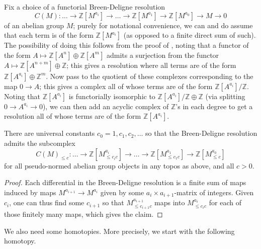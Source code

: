 Fix a choice of a functorial Breen-Deligne resolution
\[
C(M):\ldots \to \mathbb Z[M^{a_i}]\to\ldots\to\mathbb
Z[M^{a_1}]\to\mathbb Z[M^{a_0}]\to M\to 0
\]
of an abelian group $M$; purely for notational convenience, we can and do assume that each term is of the form $\mathbb Z[M^{a_i}]$ (as opposed to a finite direct sum of such). The possibility of doing this follows from the proof of \cite[Theorem 4.10]{Condensed}, noting that a functor of the form $A\mapsto \mathbb Z[A^n]\oplus \mathbb Z[A^m]$ admits a surjection from the functor $A\mapsto \mathbb Z[A^{n+m}]\oplus \mathbb Z$; this gives a resolution where all terms are of the form $\mathbb Z[A^{a_i}]\oplus \mathbb Z^m$. Now pass to the quotient of these complexes corresponding to the map $0\to A$; this gives a complex all of whose terms are of the form $\mathbb Z[A^{a_i}]/\mathbb Z$. Noting that $\mathbb Z[A^{a_i}]$ is functorially isomorphic to $\mathbb Z[A^{a_i}]/\mathbb Z\oplus \mathbb Z$ (via splitting $0\to A^{a_i}\to 0$), we can then add an acyclic complex of $\mathbb Z$'s in each degree to get a resolution all of whose terms are of the form $\mathbb Z[A^{a_i}]$.

\begin{lemma}\label{lem:constantsdeligne} There are universal constants $c_0=1,c_1,c_2,\ldots$ so that the Breen-Deligne resolution admits the subcomplex
\[
C(M)_{\leq c}: \ldots \to \mathbb Z[M^{a_i}_{\leq c_ic}]\to\ldots\to\mathbb
Z[M^{a_1}_{\leq c_1c}]\to\mathbb Z[M^{a_0}_{\leq c}]
\]
for all pseudo-normed abelian group objects in any topos as above, and all $c>0$.
\end{lemma}

\begin{proof} Each differential in the Breen-Deligne resolution is a finite sum of maps induced by maps $M^{a_{i+1}}\to M^{a_i}$ given by some $a_i\times a_{i+1}$-matrix of integers. Given $c_i$, one can thus find some $c_{i+1}$ so that $M^{a_{i+1}}_{\leq c_{i+1}c}$ maps into $M^{a_i}_{\leq c_ic}$ for each of those finitely many maps, which gives the claim.
\end{proof}

We also need some homotopies. More precisely, we start with the following homotopy.

